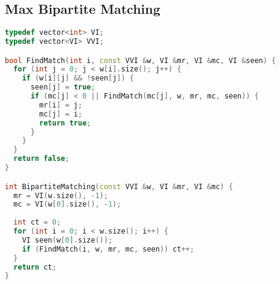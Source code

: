 \subsection{Max Bipartite Matching}
\begin{lstlisting}[language=C++]
typedef vector<int> VI;
typedef vector<VI> VVI;

bool FindMatch(int i, const VVI &w, VI &mr, VI &mc, VI &seen) {
  for (int j = 0; j < w[i].size(); j++) {
    if (w[i][j] && !seen[j]) {
      seen[j] = true;
      if (mc[j] < 0 || FindMatch(mc[j], w, mr, mc, seen)) {
        mr[i] = j;
        mc[j] = i;
        return true;
      }
    }
  }
  return false;
}

int BipartiteMatching(const VVI &w, VI &mr, VI &mc) {
  mr = VI(w.size(), -1);
  mc = VI(w[0].size(), -1);
  
  int ct = 0;
  for (int i = 0; i < w.size(); i++) {
    VI seen(w[0].size());
    if (FindMatch(i, w, mr, mc, seen)) ct++;
  }
  return ct;
}
\end{lstlisting}